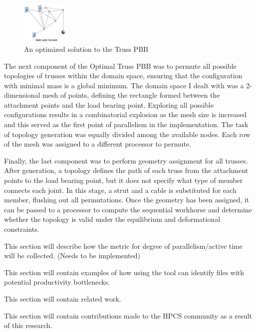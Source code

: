 \documentclass[11pt,twocolumn]{article}
\begin{document}
\begin{figure}[h]
  \centering
  \includegraphics[width=0.2\textwidth]{multijoint_truss.eps}
  \caption{An optimized solution to the Truss PBB}
  \label{fig:multijoint_truss}
\end{figure}

\pagebreak

The next component of the Optimal Truss PBB was to permute all
possible topologies of trusses within the domain space, ensuring that
the configuration with minimal mass is a global minimum.  The domain
space I dealt with was a 2-dimensional mesh of points, defining the
rectangle formed between the attachment points and the load bearing
point.  Exploring all possible configurations results in a
combinatorial explosion as the mesh size is increased and this served
as the first point of parallelism in the implementation.  The task of
topology generation was equally divided among the available nodes.
Each row of the mesh was assigned to a different processor to permute.

Finally, the last component was to perform geometry assignment for all
trusses.  After generation, a topology defines the path of each truss
from the attachment points to the load bearing point, but it does not
specify what type of member connects each joint.  In this stage, a
strut and a cable is substituted for each member, flushing out all
permutations.  Once the geometry has been assigned, it can be passed
to a processor to compute the sequential workhorse and determine
whether the topology is valid under the equilibrium and deformational
constraints.

\label{sec:dopatmetric}
This section will describe how the metric for degree of
parallelism/active time will be collected.  (Needs to be implemented)

\label{prodbottle}
This section will contain examples of how using the tool can identify
files with potential productivity bottlenecks.

\label{sec:relwork}
This section will contain related work.

\label{sec:contrib}
This section will contain contributions made to the HPCS community as
a result of this research.



\end{document}
